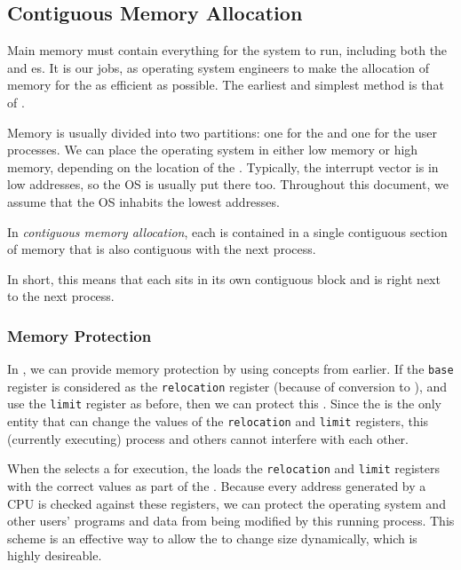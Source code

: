 \subsection{Contiguous Memory Allocation}\label{subsec:Contiguous_Memory_Allocation}
Main memory must contain everything for the system to run, including both the  and  es.
It is our jobs, as operating system engineers to make the allocation of memory for the  as efficient as possible.
The earliest and simplest method is that of .

Memory is usually divided into two partitions: one for the  and one for the user processes.
We can place the operating system in either low memory or high memory, depending on the location of the .
Typically, the interrupt vector is in low addresses, so the OS is usually put there too.
Throughout this document, we assume that the OS inhabits the lowest addresses.

\begin{definition}\label{def:Contiguous_Memory_Allocation}
  In \emph{contiguous memory allocation}, each  is contained in a single contiguous section of memory that is also contiguous with the next process.

  In short, this means that each  sits in its own contiguous block and is right next to the next process.
\end{definition}

\subsubsection{Memory Protection}\label{subsubsec:Contiguous_Memory_Protection}
In , we can provide memory protection by using concepts from earlier.
If the \texttt{base} register is considered as the \texttt{relocation} register (because of  conversion to ), and use the \texttt{limit} register as before, then we can protect this .
Since the  is the only entity that can change the values of the \texttt{relocation} and \texttt{limit} registers, this (currently executing) process and others cannot interfere with each other.

When the  selects a  for execution, the  loads the \texttt{relocation} and \texttt{limit} registers with the correct values as part of the .
Because every address generated by a CPU is checked against these registers, we can protect the operating system and other users’ programs and data from being modified by this running process.
This scheme is an effective way to allow the  to change size dynamically, which is highly desireable.


